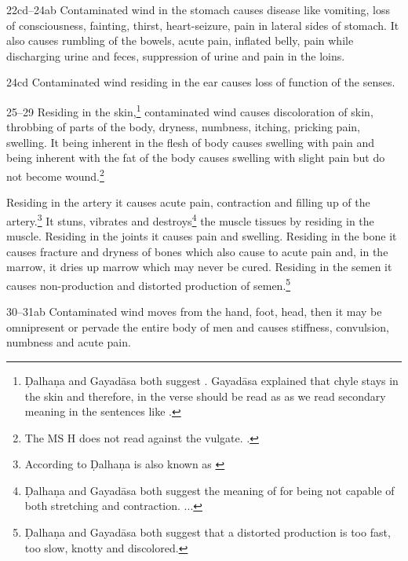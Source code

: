 \begin{translation}
\item[22cd--24ab] Contaminated wind in the stomach causes disease like
vomiting, loss of consciousness, fainting, thirst, heart-seizure, pain in
lateral sides of stomach. It also causes rumbling of the bowels, acute
pain, inflated belly, pain while discharging urine and feces, suppression
of urine and pain in the loins.

\item[24cd]Contaminated wind residing in the ear causes loss of function of the 
senses.

\item[25--29] Residing in the skin,\footnote{Ḍalhaṇa and Gayadāsa both 
suggest . Gayadāsa explained that chyle stays in the skin and 
therefore, in the verse  should be read as  as we 
read 
secondary meaning in the sentences like .} 
contaminated 
wind causes discoloration of skin, throbbing of parts of the body, dryness, 
numbness, itching, pricking pain, swelling. It being inherent in the flesh of body 
causes swelling with pain and being inherent with the fat of the body causes 
swelling with slight pain but do not become wound.\footnote{The MS H does 
not 
read  against the 
vulgate. 
\citep[261]{vulgate}.}

Residing in the artery it causes acute pain, contraction and filling up of the 
artery.\footnote{According to Ḍalhaṇa  is also known as 
 \citep[262]{vulgate}} It stuns, vibrates and 
destroys\footnote{Ḍalhaṇa and Gayadāsa both suggest the meaning of 
 for being not capable of both stretching and contraction. 
\citep[262]{vulgate} 
...} 
the muscle tissues by residing in the muscle. Residing in the joints it causes 
pain 
and swelling. Residing in the bone it causes fracture and dryness of bones 
which 
also cause to acute pain and, in the marrow, it dries up marrow which may 
never 
be cured. Residing in the semen it causes non-production and distorted 
production of semen.\footnote{Ḍalhaṇa and Gayadāsa both suggest that a 
distorted production  is too fast, too slow, knotty and 
discolored.} 


\item[30--31ab] Contaminated wind moves from the hand, foot, head, then it 
may be omnipresent or pervade the entire body of men and causes stiffness, 
convulsion, numbness and acute pain.


\end{translation}
